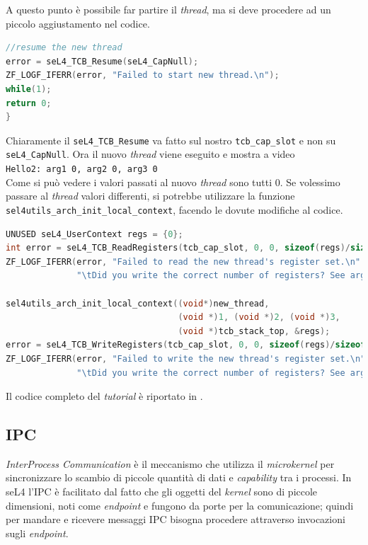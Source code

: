 A questo punto è possibile far partire il \textit{thread}, ma si deve procedere ad un piccolo aggiustamento nel codice.
\begin{lstlisting}[language=C++]
//resume the new thread
error = seL4_TCB_Resume(seL4_CapNull);
ZF_LOGF_IFERR(error, "Failed to start new thread.\n");
while(1);
return 0;
}
\end{lstlisting}

Chiaramente il \texttt{seL4\_TCB\_Resume} va fatto sul nostro \texttt{tcb\_cap\_slot} e non su \texttt{seL4\_CapNull}. Ora il nuovo \textit{thread} viene eseguito e mostra a video\\
\texttt{Hello2: arg1 0, arg2 0, arg3 0}\\
Come si può vedere i valori passati al nuovo \textit{thread} sono tutti 0. Se volessimo passare al \textit{thread} valori differenti, si potrebbe utilizzare la funzione \texttt{sel4utils\_arch\_init\_local\_context}, facendo le dovute modifiche al codice.
\begin{lstlisting}[language=C++]
UNUSED seL4_UserContext regs = {0};
int error = seL4_TCB_ReadRegisters(tcb_cap_slot, 0, 0, sizeof(regs)/sizeof(seL4_Word), &regs);
ZF_LOGF_IFERR(error, "Failed to read the new thread's register set.\n"
              "\tDid you write the correct number of registers? See arg4.\n");

sel4utils_arch_init_local_context((void*)new_thread,
                                  (void *)1, (void *)2, (void *)3,
                                  (void *)tcb_stack_top, &regs);
error = seL4_TCB_WriteRegisters(tcb_cap_slot, 0, 0, sizeof(regs)/sizeof(seL4_Word), &regs);
ZF_LOGF_IFERR(error, "Failed to write the new thread's register set.\n"
              "\tDid you write the correct number of registers? See arg4.\n");
\end{lstlisting}
Il codice completo del \textit{tutorial} è riportato in \cite{threads}.

\subsection{IPC}
\textit{InterProcess Communication} è il meccanismo che utilizza il \textit{microkernel} per sincronizzare lo scambio di  piccole quantità di dati e \textit{capability} tra i processi. In seL4 l'IPC è facilitato dal fatto che gli oggetti del \textit{kernel} sono di piccole dimensioni, noti come \textit{endpoint} e fungono da porte per la comunicazione; quindi per mandare e ricevere messaggi IPC bisogna procedere attraverso invocazioni sugli \textit{endpoint}.

